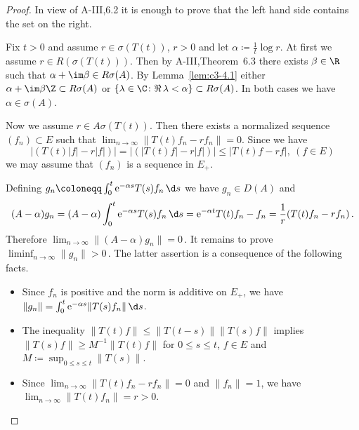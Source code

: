 \begin{proof}
In view of A-III,6.2 it is enough to prove that the left hand
side contains the set on the right.

Fix $t > 0$ and assume $r \in \sigma(T(t))$, $r > 0$ and let $\alpha \coloneqq \frac{1}{t} \log r$.
At first we assume $r \in R(\sigma(T(t)))$.
Then by A-III,Theorem~6.3 there exists
$\beta \in \R $ such that $\alpha+\im\beta \in R\sigma(A)$.
By Lemma~\ref{lem:c3-4.1} either $\alpha+\im\beta\Z \subset R\sigma(A)$
or $\{\lambda \in \C  \colon \Re\, \lambda < \alpha\} \subset R\sigma(A)$.
In both cases we have $\alpha \in \sigma(A)$.

Now we assume $r \in A\sigma(T(t))$.
Then there exists a normalized sequence
$(f_n) \subset E$ such that $\lim_{n \to \infty}\|T(t)f_n - rf_n\| = 0$.
Since we have
\[
|(T(t)|f| - r|f|)| = |(|T(t)f| - r|f|)| \leq |T(t)f - rf|, \  (f \in E) 
\]
we may assume that $(f_n)$ is a sequence in $E_+$.

Defining $g_n \coloneqq \int_{0}^{t} \mathrm{e}^{-\alpha s}T(s)f_n \, \d s $ we have $g_n \in D(A)$ and
\[
(A-\alpha)g_n = (A-\alpha)\int_{0}^{t} \mathrm{e}^{-\alpha s}T(s)f_n \, \d s = \mathrm{e}^{-\alpha t}T(t)f_n - f_n = \frac{1}{r}(T(t)f_n - rf_n)\,.
\]
Therefore $\lim_{n \to \infty}\|(A - \alpha) g_n\| = 0$\,. It remains to prove 
$\liminf_{n \to \infty}\|g_n\| > 0$\,.
The latter assertion is a consequence of the
following facts.
\begin{itemize}
	\item
	Since $f_n$ is positive and the norm is additive on $E_+$,
	we have
	\\ 
	$\|g_n\| = \int_{0}^{t} \mathrm{e}^{-\alpha s}\|T(s)f_n\| \, \d s$.
	
	\item The inequality $\|T(t)f\| \leq \|T(t-s)\|\|T(s)f\|$ implies
	$\|T(s)f\| \geq M^{-1}\|T(t)f\|$ for $0 \leq s \leq t$, $f \in E$ and $M \coloneqq \sup_{0 \leq s \leq t}\|T(s)\|$.
	 
	 \item 
	 Since $\lim_{n \to \infty}\|T(t)f_n - rf_n\| = 0$ and $\|f_n\| = 1$, we have
	 \\
	 $\lim_{n \to \infty}\|T(t)f_n\| = r > 0$.
\end{itemize}
\end{proof}
%

